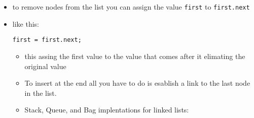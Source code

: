 \documentclass[11pt]{report}
\begin{document}
\begin{itemize}
\begin{verbatim}
\end{verbatim}
\begin{itemize}
\item to remove nodes from the list you can assign the value \texttt{first} to \texttt{first.next}

\item like this:
\begin{verbatim}
first = first.next;
\end{verbatim}
\begin{itemize}
\item this assing the first value to the value that comes after it
elimating the original value
\item To insert at the end all you have to do is esablish a link to the last node
in the list.

\item Stack, Queue, and Bag implentations for linked lists:
\end{itemize}
\end{itemize}
\end{itemize}
\end{document}
